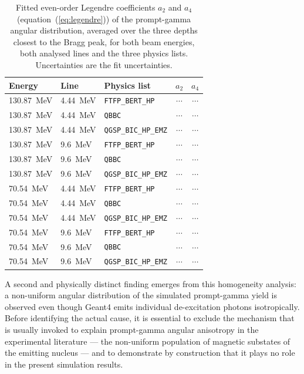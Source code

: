 \documentclass[a4paper]{article}
\begin{document}
\begin{table}[h]
\centering
\caption{Fitted even-order Legendre coefficients $a_2$ and $a_4$ (equation~(\ref{eq:legendre})) of the prompt-gamma angular distribution, averaged over the three depths closest to the Bragg peak, for both beam energies, both analysed lines and the three physics lists. Uncertainties are the fit uncertainties.}
\label{tab:legendre}
\begin{tabular}{lllcc}
\toprule
Energy & Line & Physics list & $a_2$ & $a_4$ \\
\midrule
130.87~MeV & 4.44~MeV & \texttt{FTFP\_BERT\_HP}     & $\cdots$ & $\cdots$ \\
130.87~MeV & 4.44~MeV & \texttt{QBBC}               & $\cdots$ & $\cdots$ \\
130.87~MeV & 4.44~MeV & \texttt{QGSP\_BIC\_HP\_EMZ} & $\cdots$ & $\cdots$ \\
\midrule
130.87~MeV & 9.6~MeV  & \texttt{FTFP\_BERT\_HP}     & $\cdots$ & $\cdots$ \\
130.87~MeV & 9.6~MeV  & \texttt{QBBC}               & $\cdots$ & $\cdots$ \\
130.87~MeV & 9.6~MeV  & \texttt{QGSP\_BIC\_HP\_EMZ} & $\cdots$ & $\cdots$ \\
\midrule
70.54~MeV  & 4.44~MeV & \texttt{FTFP\_BERT\_HP}     & $\cdots$ & $\cdots$ \\
70.54~MeV  & 4.44~MeV & \texttt{QBBC}               & $\cdots$ & $\cdots$ \\
70.54~MeV  & 4.44~MeV & \texttt{QGSP\_BIC\_HP\_EMZ} & $\cdots$ & $\cdots$ \\
\midrule
70.54~MeV  & 9.6~MeV  & \texttt{FTFP\_BERT\_HP}     & $\cdots$ & $\cdots$ \\
70.54~MeV  & 9.6~MeV  & \texttt{QBBC}               & $\cdots$ & $\cdots$ \\
70.54~MeV  & 9.6~MeV  & \texttt{QGSP\_BIC\_HP\_EMZ} & $\cdots$ & $\cdots$ \\
\bottomrule
\end{tabular}
\end{table}

A second and physically distinct finding emerges from this homogeneity analysis: a non-uniform angular distribution of the simulated prompt-gamma yield is observed even though Geant4 emits individual de-excitation photons isotropically. Before identifying the actual cause, it is essential to exclude the mechanism that is usually invoked to explain prompt-gamma angular anisotropy in the experimental literature — the non-uniform population of magnetic substates of the emitting nucleus — and to demonstrate by construction that it plays no role in the present simulation results.
\end{document}
